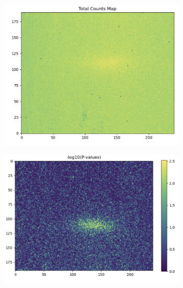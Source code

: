 \documentclass{article}
\begin{document}
\begin{figure}[htbp]
    \centering
    \begin{subfigure}{0.45\textwidth}
        \centering
        \includegraphics[width=\textwidth]{raw.png}
        \caption{}
        \label{fig:raw}
    \end{subfigure}
    \hfill  %
    \begin{subfigure}{0.45\textwidth}
        \centering
        \includegraphics[width=\textwidth]{highcontrast.png}
        \caption{}
        \label{fig:highcontrast}
    \end{subfigure}
    

\end{figure}
\end{document}
